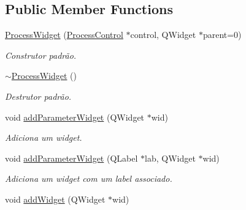 \subsection*{Public Member Functions}
\begin{DoxyCompactItemize}
\item 
\hypertarget{class_process_widget_a31a32f45ceeddbd698d06d74336f82a5}{}\hyperlink{class_process_widget_a31a32f45ceeddbd698d06d74336f82a5}{Process\+Widget} (\hyperlink{class_process_control}{Process\+Control} $\ast$control, Q\+Widget $\ast$parent=0)\label{class_process_widget_a31a32f45ceeddbd698d06d74336f82a5}

\begin{DoxyCompactList}\small\item\em Construtor padrão. \end{DoxyCompactList}\item 
\hypertarget{class_process_widget_a8f3d4a1e3040c7694f8058c29e954952}{}\hyperlink{class_process_widget_a8f3d4a1e3040c7694f8058c29e954952}{$\sim$\+Process\+Widget} ()\label{class_process_widget_a8f3d4a1e3040c7694f8058c29e954952}

\begin{DoxyCompactList}\small\item\em Destrutor padrão. \end{DoxyCompactList}\item 
\hypertarget{class_process_widget_a956ae288828446d19581733815bad2b9}{}void \hyperlink{class_process_widget_a956ae288828446d19581733815bad2b9}{add\+Parameter\+Widget} (Q\+Widget $\ast$wid)\label{class_process_widget_a956ae288828446d19581733815bad2b9}

\begin{DoxyCompactList}\small\item\em Adiciona um widget. \end{DoxyCompactList}\item 
\hypertarget{class_process_widget_a9f19decc1f3154663af9222560b7aea0}{}void \hyperlink{class_process_widget_a9f19decc1f3154663af9222560b7aea0}{add\+Parameter\+Widget} (Q\+Label $\ast$lab, Q\+Widget $\ast$wid)\label{class_process_widget_a9f19decc1f3154663af9222560b7aea0}

\begin{DoxyCompactList}\small\item\em Adiciona um widget com um label associado. \end{DoxyCompactList}\item 
\hypertarget{class_process_widget_a458442ffa37c1bb997af6e2ae392d4c9}{}void \hyperlink{class_process_widget_a458442ffa37c1bb997af6e2ae392d4c9}{add\+Widget} (Q\+Widget $\ast$wid)\label{class_process_widget_a458442ffa37c1bb997af6e2ae392d4c9}


\end{DoxyCompactItemize}
